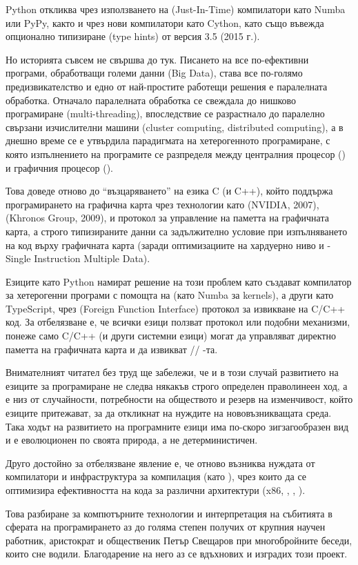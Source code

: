 Python откликва чрез използването
на  (Just-In-Time) компилатори като Numba или PyPy, както и чрез нови компилатори като Cython, като също въвежда опционално типизиране (type hints) от версия 3.5 (2015 г.).

Но историята съвсем не свършва до тук. Писането на все по-ефективни програми, обработващи големи данни (Big Data),
става все по-голямо предизвикателство и едно от най-простите работещи решения е паралелната обработка.
Отначало паралелната обработка се свеждала до нишково програмиране (multi-threading), впоследствие се разрастнало до
паралелно свързани изчислителни машини (cluster computing, distributed computing), а в днешно време се е утвърдила парадигмата на хетерогенното програмиране,
с която изпълнението на програмите се разпределя между централния процесор () и графичния процесор ().

Това доведе отново до ``възцаряването'' на езика C (и C++), който поддържа програмирането на графична карта чрез технологии като  (NVIDIA, 2007),  (Khronos Group, 2009),  и протокол за
управление на паметта на графичната карта, а строго типизираните данни са задължително условие
при изпълняването на код върху графичната карта (заради оптимизациите на хардуерно ниво и  - Single Instruction Multiple Data).

Езиците като Python намират решение на този проблем като
създават компилатор за хетерогенни програми с помощта на  (като Numba за  kernels), а други като TypeScript, чрез  (Foreign Function Interface) протокол за извикване на C/C++ код.
За отбелязване е, че всички езици ползват  протокол или подобни механизми, понеже само C/C++ (и други системни езици) могат да управляват директно паметта на графичната карта и да извикват // -та.

Внимателният читател без труд ще забележи, че и в този случай
развитието на езиците за програмиране не следва някакъв строго определен праволинеен ход, а е низ от случайности,
потребности на обществото и резерв на изменчивост, който езиците притежават, за да откликнат на нуждите на
нововъзникващата среда. Така ходът на развитието на програмните езици има по-скоро зигзагообразен вид и
е еволюционен по своята природа, а не детерминистичен.

Друго достойно за отбелязване явление е, че отново възниква
нуждата от компилатори и инфраструктура за компилация (като ), чрез които да се оптимизира ефективността на кода за различни архитектури (x86, , , ).

Това разбиране за компютърните технологии и интерпретация на събитията в сферата на програмирането
аз до голяма степен получих от крупния научен работник, аристократ и общественик Петър Свещаров при многобройните беседи, които сне водили. 
Благодарение на него аз се вдъхнових и изградих този проект.

